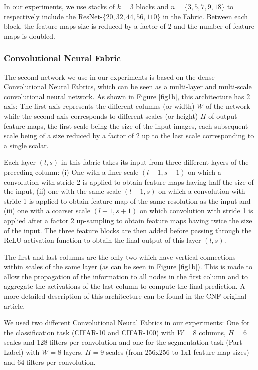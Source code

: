 \documentclass[10pt,twocolumn,letterpaper]{article}
\begin{document}
In our experiments, we use stacks of $k=3$ blocks and $n=\{3, 5, 7, 9, 18\}$ to respectively include the ResNet-$\{20,32,44,56,110\}$ in the Fabric. Between each block, the feature maps size is reduced by a factor of 2 and the number of feature maps is doubled.

\subsubsection*{Convolutional Neural Fabric}
The second network we use in our experiments is based on the dense Convolutional Neural Fabrics, which can be seen as a multi-layer and multi-scale convolutional neural network.  As shown in Figure \ref{fig1b}, this architecture has 2 axis: The first axis represents the different columns (or width) $W$ of the network while the second axis corresponds to different scales (or height) $H$ of output feature maps, the first scale being the size of the input images, each subsequent scale being of a size reduced by a factor of 2 up to the last scale corresponding to a single scalar.

Each layer $(l, s)$ in this fabric takes its input from three different layers of the preceding column: (i) One with a finer scale $(l-1, s-1)$ on which a convolution with stride 2 is applied to obtain feature maps having half the size of the input, (ii) one with the same scale $(l-1, s)$ on which a convolution with stride 1 is applied to obtain feature map of the same resolution as the input and (iii) one with a coarser scale $(l-1, s+1)$ on which  convolution with stride 1 is applied after a factor 2 up-sampling to obtain feature maps having twice the size of the input. The three feature blocks are then added before passing through the ReLU activation function to obtain the final output of this layer $(l, s)$. 

The first and last columns are the only two which have vertical connections within scales of the same layer (as can be seen in Figure \ref{fig1b}). This is made to allow the propagation of the information to all nodes in the first column and to aggregate the activations of the last column to compute the final prediction. A more detailed description of this architecture can be found in the CNF original article.

We used two different Convolutional Neural Fabrics in our experiments: One for the classification task (CIFAR-10 and CIFAR-100) with $W=8$ columns, $H=6$ scales and 128 filters per convolution and one for the segmentation task (Part Label) with $W=8$ layers, $H=9$ scales (from 256x256 to 1x1 feature map sizes) and 64 filters per convolution.
\end{document}
